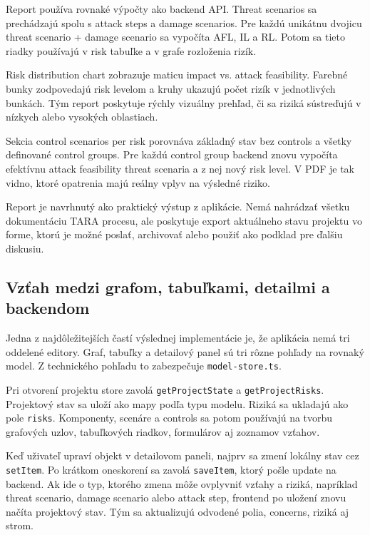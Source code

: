 \documentclass[11pt]{article}
\begin{document}
Report používa rovnaké výpočty ako backend API. Threat scenarios sa prechádzajú spolu s attack steps a damage scenarios. Pre každú unikátnu dvojicu threat scenario + damage scenario sa vypočíta AFL, IL a RL. Potom sa tieto riadky používajú v risk tabuľke a v grafe rozloženia rizík.

Risk distribution chart zobrazuje maticu impact vs. attack feasibility. Farebné bunky zodpovedajú risk levelom a kruhy ukazujú počet rizík v jednotlivých bunkách. Tým report poskytuje rýchly vizuálny prehľad, či sa riziká sústreďujú v nízkych alebo vysokých oblastiach.

Sekcia control scenarios per risk porovnáva základný stav bez controls a všetky definované control groups. Pre každú control group backend znovu vypočíta efektívnu attack feasibility threat scenaria a z nej nový risk level. V PDF je tak vidno, ktoré opatrenia majú reálny vplyv na výsledné riziko.

Report je navrhnutý ako praktický výstup z aplikácie. Nemá nahrádzať všetku dokumentáciu TARA procesu, ale poskytuje export aktuálneho stavu projektu vo forme, ktorú je možné poslať, archivovať alebo použiť ako podklad pre ďalšiu diskusiu.

\subsection{Vzťah medzi grafom, tabuľkami, detailmi a backendom}

Jedna z najdôležitejších častí výslednej implementácie je, že aplikácia nemá tri oddelené editory. Graf, tabuľky a detailový panel sú tri rôzne pohľady na rovnaký model. Z technického pohľadu to zabezpečuje \texttt{model-store.ts}.

Pri otvorení projektu store zavolá \texttt{getProjectState} a \texttt{getProjectRisks}. Projektový stav sa uloží ako mapy podľa typu modelu. Riziká sa ukladajú ako pole \texttt{risks}. Komponenty, scenáre a controls sa potom používajú na tvorbu grafových uzlov, tabuľkových riadkov, formulárov aj zoznamov vzťahov.

Keď uživateľ upraví objekt v detailovom paneli, najprv sa zmení lokálny stav cez \texttt{setItem}. Po krátkom oneskorení sa zavolá \texttt{saveItem}, ktorý pošle update na backend. Ak ide o typ, ktorého zmena môže ovplyvniť vzťahy a riziká, napríklad threat scenario, damage scenario alebo attack step, frontend po uložení znovu načíta projektový stav. Tým sa aktualizujú odvodené polia, concerns, riziká aj strom.
\end{document}
